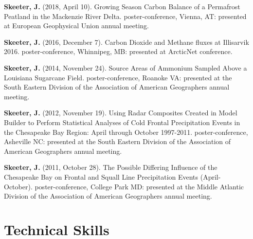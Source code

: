 \documentclass[
]{article}
\newlength{\cslhangindent}
\newlength{\cslentryspacingunit} %
\newenvironment{CSLReferences}[2] %
 {%
  \setlength{\parindent}{0pt}
  \ifodd #1
  \let\oldpar\par
  \def\par{\hangindent=\cslhangindent\oldpar}
  \fi
  \setlength{\parskip}{#2\cslentryspacingunit}
 }%
 {}
\begin{document}
\hypertarget{refs-4.3}{}
\begin{CSLReferences}{1}{0}
\leavevmode{}%
\textbf{Skeeter, J.} (2018, April 10). Growing Season Carbon Balance of
a Permafrost Peatland in the Mackenzie River Delta. poster-conference,
Vienna, AT: presented at European Geophysical Union annual meeting.

\leavevmode{}%
\textbf{Skeeter, J.} (2016, December 7). Carbon Dioxide and Methane
fluxes at Illisarvik 2016. poster-conference, Whinnipeg, MB: presented
at ArcticNet conference.

\leavevmode{}%
\textbf{Skeeter, J.} (2014, November 24). Source Areas of Ammonium
Sampled Above a Louisiana Sugarcane Field. poster-conference, Roanoke
VA: presented at the South Eastern Division of the Association of
American Geographers annual meeting.

\leavevmode{}%
\textbf{Skeeter, J.} (2012, November 19). Using Radar Composites Created
in Model Builder to Perform Statistical Analyses of Cold Frontal
Precipitation Events in the Chesapeake Bay Region: April through October
1997-2011. poster-conference, Asheville NC: presented at the South
Eastern Division of the Association of American Geographers annual
meeting.

\leavevmode{}%
\textbf{Skeeter, J.} (2011, October 28). The Possible Differing
Influence of the Chesapeake Bay on Frontal and Squall Line Precipitation
Events (April-October). poster-conference, College Park MD: presented at
the Middle Atlantic Division of the Association of American Geographers
annual meeting.

\end{CSLReferences}

\hypertarget{technical-skills}{%
\section{Technical Skills}\label{technical-skills}}
\end{document}
